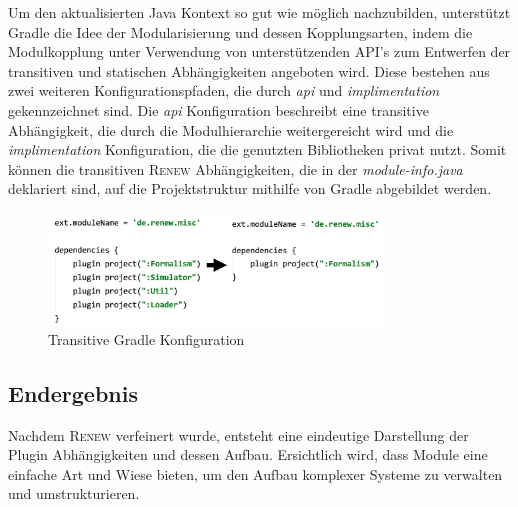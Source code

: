 	Um den aktualisierten Java Kontext so gut wie möglich nachzubilden, unterstützt Gradle die Idee der  Modularisierung und dessen Kopplungsarten, indem die Modulkopplung unter Verwendung von unterstützenden API's zum Entwerfen der transitiven und statischen Abhängigkeiten angeboten wird. Diese bestehen aus zwei weiteren Konfigurationspfaden, die durch \textit{api} und \textit{implimentation} gekennzeichnet sind. Die \textit{api} Konfiguration beschreibt eine transitive Abhängigkeit, die durch die Modulhierarchie weitergereicht wird und die \textit{implimentation} Konfiguration, die die genutzten Bibliotheken privat nutzt. Somit können die transitiven \textsc{Renew} Abhängigkeiten, die in der \textit{module-info.java} deklariert sind, auf die Projektstruktur mithilfe von Gradle abgebildet werden.

	\begin{figure}[h!]
	  \centering
	  \includegraphics[width=0.8\textwidth]{material/images/gradle_misc.png}
	  \caption{Transitive Gradle Konfiguration}
	  \label{fig:trans_gradle}
	\end{figure}

\subsection{Endergebnis} \label{sub:endergebnis}
	Nachdem \textsc{Renew} verfeinert wurde, entsteht eine eindeutige Darstellung der Plugin Abhängigkeiten und dessen Aufbau. Ersichtlich wird, dass Module eine einfache Art und Wiese bieten, um den Aufbau komplexer Systeme zu verwalten und umstrukturieren.

